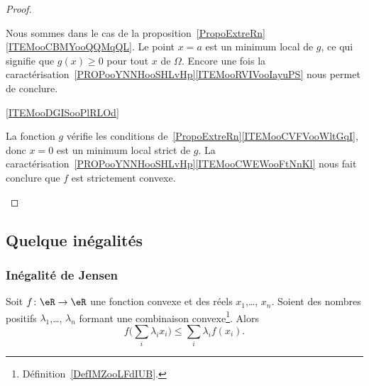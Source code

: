 \begin{proof}
\begin{subproof}
            Nous sommes dans le cas de la proposition~\ref{PropoExtreRn}\ref{ITEMooCBMYooQQMqQL}. Le point \( x=a\) est un minimum local de \( g\), ce qui signifie que \( g(x)\geq 0\) pour tout \( x\) de \( \Omega\). Encore une fois la caractérisation~\ref{PROPooYNNHooSHLvHp}\ref{ITEMooRVIVooIayuPS} nous permet de conclure.

        \item[\ref{ITEMooDGISooPlRLOd}]

            La fonction \( g\) vérifie les conditions de~\ref{PropoExtreRn}\ref{ITEMooCVFVooWltGqI}, donc \( x=0\) est un minimum local strict de \( g\). La caractérisation~\ref{PROPooYNNHooSHLvHp}\ref{ITEMooCWEWooFtNnKl} nous fait conclure que \( f\) est strictement convexe.

    \end{subproof}
\end{proof}

\subsection{Quelque inégalités}

\subsubsection{Inégalité de Jensen}

\begin{proposition}    \label{PropXIBooLxTkhU}
    Soit \( f\colon \eR\to \eR\) une fonction convexe et des réels \( x_1\),\ldots,  \( x_n\). Soient des nombres positifs \( \lambda_1\),\ldots,  \( \lambda_n\) formant une combinaison convexe\footnote{Définition~\ref{DefIMZooLFdIUB}.}. Alors
    \begin{equation}
        f\big( \sum_i\lambda_ix_i \big)\leq \sum_i\lambda_if(x_i).
    \end{equation}
\end{proposition}

